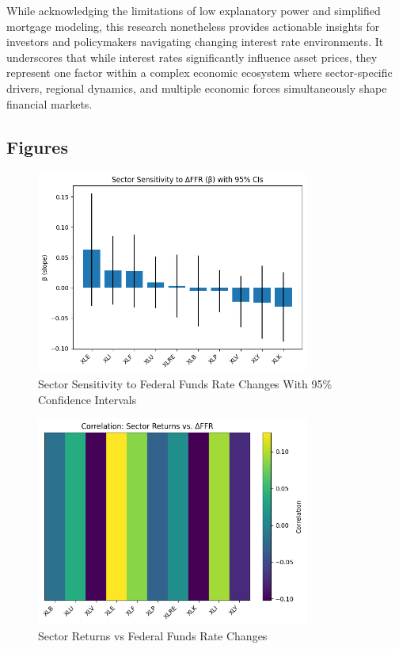 \documentclass[12pt, stu, abstract]{apa7}
\begin{document}
While acknowledging the limitations of low explanatory power and simplified mortgage modeling, this research nonetheless provides actionable insights for investors and policymakers navigating changing interest rate environments. It underscores that while interest rates significantly influence asset prices, they represent one factor within a complex economic ecosystem where sector-specific drivers, regional dynamics, and multiple economic forces simultaneously shape financial markets.

\printbibliography

\begin{appendices}
\section{Figures}
\begin{figure}[htbp]
    \centering
    \includegraphics[width=0.8\textwidth]{../figs/sector_sens_to_ffr.png}
    \caption{Sector Sensitivity to Federal Funds Rate Changes With 95\% Confidence Intervals}
    \label{fig:sector_sens}
\end{figure}

\begin{figure}[htbp]
    \centering
    \includegraphics[width=0.8\textwidth]{../figs/sector_return_vs_ffr.png}
    \caption{Sector Returns vs Federal Funds Rate Changes}
    \label{fig:sector_return}
\end{figure}


\end{appendices}
\end{document}
